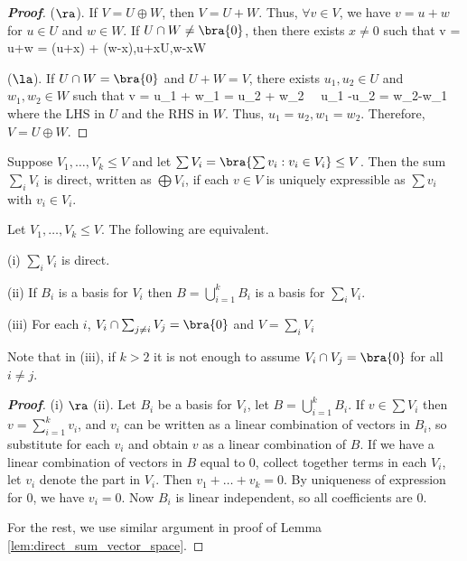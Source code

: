 \begin{proof}[\bf Proof]
($\ra$). If $V = U \oplus W$, then $V = U + W$. Thus, $\forall v \in V$, we have $v = u + w$ for $u\in U$ and $w\in W$. If $U\cap W \neq \bra{0}$, then there exists $x\neq 0$ such that
\be
v = u+w = (u+x) + (w-x),\quad u+x\in U,w-x\in W \ \ra \ 
\ee

($\la$). If $U \cap W = \bra{0}$ and $U+W = V$, there exists $u_1,u_2\in U$ and $w_1,w_2 \in W$ such that
\be
v = u_1 + w_1 = u_2 + w_2 \ \ra \ u_1 -u_2 = w_2-w_1
\ee
where the LHS in $U$ and the RHS in $W$. Thus, $u_1 = u_2,w_1 = w_2$. Therefore, $V = U\oplus W$.
\end{proof}



\begin{definition}\label{def:n_direct_sum_vector_space}
Suppose $V_1, \dots, V_k \leq V$ and let $\sum V_i = \bra{\sum v_i : v_i \in V_i} \leq V$. Then the sum $\sum_i V_i$ is direct, written as $\bigoplus V_i$, if each $v \in V$ is uniquely expressible as $\sum v_i$ with $v_i \in V_i$.
\end{definition}

\begin{lemma}
Let $V_1, \dots, V_k \leq V$. The following are equivalent.
\ben
\item [(i)] $\sum_i V_i$ is direct.
\item [(ii)] If $B_i$ is a basis for $V_i$ then $B = \bigcup^k_{i=1} B_i$ is a basis for $\sum_i V_i$.
\item [(iii)] For each $i$, $V_i \cap \sum_{j\neq i} V_j = \bra{0}$ and $V = \sum_i V_i$
\een
\end{lemma}

Note that in (iii), if $k > 2$ it is not enough to assume $V_i \cap V_j = \bra{0}$ for all $i \neq j$.

\begin{proof}[\bf Proof]
(i) $\ra$ (ii). Let $B_i$ be a basis for $V_i$, let $B = \bigcup^k_{i=1} B_i$. If $v \in \sum V_i$ then $v = \sum^k_{i=1} v_i$, and $v_i$ can be written as a linear combination of vectors in $B_i$, so substitute for each $v_i$ and obtain $v$ as a linear combination of $B$. If we have a linear
combination of vectors in $B$ equal to 0, collect together terms in each $V_i$, let $v_i$ denote the part in $V_i$. Then $v_1+\dots+v_k = 0$. By uniqueness of expression for 0, we have $v_i = 0$. Now $B_i$ is linear independent, so all coefficients are 0.

For the rest, we use similar argument in proof of Lemma \ref{lem:direct_sum_vector_space}.
\end{proof}

